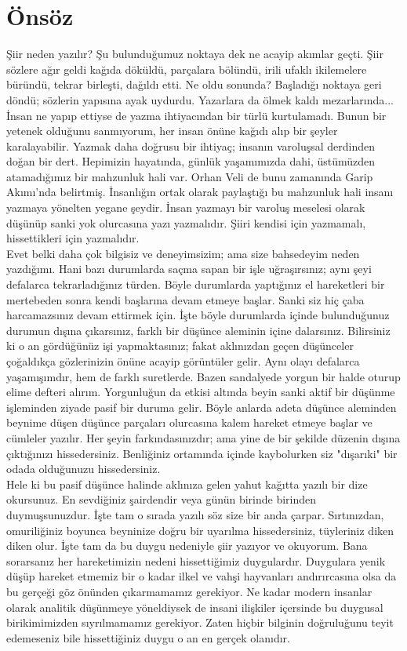 \section{Önsöz}

Şiir neden yazılır? Şu bulunduğumuz noktaya dek ne acayip akımlar geçti. Şiir sözlere ağır geldi kağıda döküldü, parçalara bölündü, irili ufaklı ikilemelere büründü, tekrar birleşti, dağıldı etti. Ne oldu sonunda? Başladığı noktaya geri döndü; sözlerin yapısına ayak uydurdu. Yazarlara da ölmek kaldı mezarlarında...
İnsan ne yapıp ettiyse de yazma ihtiyacından bir türlü kurtulamadı. Bunun bir yetenek olduğunu sanmıyorum, her insan önüne kağıdı alıp bir şeyler karalayabilir. Yazmak daha doğrusu bir ihtiyaç; insanın varoluşsal derdinden doğan bir dert. Hepimizin hayatında, günlük yaşamımızda dahi, üstümüzden atamadığımız bir mahzunluk hali var. Orhan Veli de bunu zamanında Garip Akımı'nda belirtmiş. İnsanlığın ortak olarak paylaştığı bu mahzunluk hali insanı yazmaya yönelten yegane şeydir. İnsan yazmayı bir varoluş meselesi olarak düşünüp sanki yok olurcasına yazı yazmalıdır. Şiiri kendisi için yazmamalı, hissettikleri için yazmalıdır.\\

Evet belki daha çok bilgisiz ve deneyimsizim; ama size bahsedeyim neden yazdığımı. Hani bazı durumlarda saçma sapan bir işle uğraşırsınız; aynı şeyi defalarca tekrarladığınız türden. Böyle durumlarda yaptığınız el hareketleri bir mertebeden sonra kendi başlarına devam etmeye başlar. Sanki siz hiç çaba harcamazsınız devam ettirmek için. İşte böyle durumlarda içinde bulunduğunuz durumun dışına çıkarsınız, farklı bir düşünce aleminin içine dalarsınız. Bilirsiniz ki o an gördüğünüz işi yapmaktasınız; fakat aklınızdan geçen düşünceler çoğaldıkça gözlerinizin önüne acayip görüntüler gelir. Aynı olayı defalarca yaşamışımdır, hem de farklı suretlerde. Bazen sandalyede yorgun bir halde oturup elime defteri alırım. Yorgunluğun da etkisi altında beyin sanki aktif bir düşünme işleminden ziyade pasif bir duruma gelir. Böyle anlarda adeta düşünce aleminden beynime düşen düşünce parçaları olurcasına kalem hareket etmeye başlar ve cümleler yazılır. Her şeyin farkındasınızdır; ama yine de bir şekilde düzenin dışına çıktığınızı hissedersiniz. Benliğiniz ortamında içinde kaybolurken siz "dışarıki" bir odada olduğunuzu hissedersiniz.\\

Hele ki bu pasif düşünce halinde aklınıza gelen yahut kağıtta yazılı bir dize okursunuz. En sevdiğiniz şairdendir veya günün birinde birinden duymuşsunuzdur. İşte tam o sırada yazılı söz size bir anda çarpar. Sırtınızdan, omuriliğiniz boyunca beyninize doğru bir uyarılma hissedersiniz, tüyleriniz diken diken olur. İşte tam da bu duygu nedeniyle şiir yazıyor ve okuyorum. Bana sorarsanız her hareketimizin nedeni hissettiğimiz duygulardır. Duygulara yenik düşüp hareket etmemiz bir o kadar ilkel ve vahşi hayvanları andırırcasına olsa da bu gerçeği göz önünden çıkarmamamız gerekiyor. Ne kadar modern insanlar olarak analitik düşünmeye yöneldiysek de insani ilişkiler içersinde bu duygusal birikimimizden sıyrılmamamız gerekiyor. Zaten hiçbir bilginin doğruluğunu teyit edemeseniz bile hissettiğiniz duygu o an en gerçek olanıdır.\\

